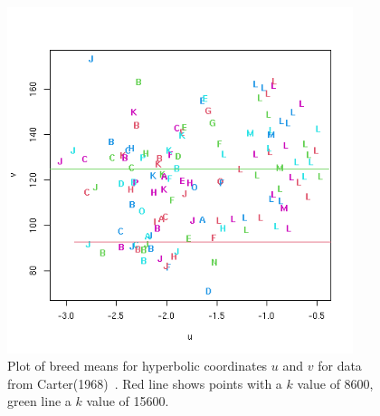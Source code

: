 %

\begin{figure}[h]
  \centering
   \includegraphics[width=0.9\textwidth]{carter68/hypcoordcarter68.png}
  \caption{Plot of breed means for hyperbolic coordinates $u$ and $v$ for data from Carter(1968)~\cite{cart:68}. Red line shows points with a $k$ value of 8600, green line a $k$ value of 15600.}
  \label{fig:hypcoord}
\end{figure}

%

